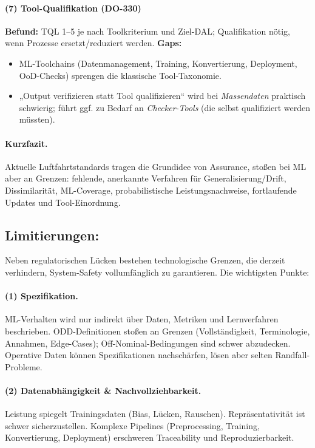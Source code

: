 \paragraph{(7) Tool-Qualifikation (DO-330)}
\textbf{Befund:} TQL 1–5 je nach Toolkriterium und Ziel-DAL; Qualifikation nötig, wenn Prozesse ersetzt/reduziert werden.  
\textbf{Gaps:}
\begin{itemize}
  \item ML-Toolchains (Datenmanagement, Training, Konvertierung, Deployment, OoD-Checks) sprengen die klassische Tool-Taxonomie.
  \item „Output verifizieren statt Tool qualifizieren“ wird bei \emph{Massendaten} praktisch schwierig; führt ggf. zu Bedarf an \emph{Checker-Tools} (die selbst qualifiziert werden müssten).
\end{itemize}

\paragraph{Kurzfazit.}
Aktuelle Luftfahrtstandards tragen die Grundidee von Assurance, stoßen bei ML aber an Grenzen: fehlende, anerkannte Verfahren für Generalisierung/Drift, Dissimilarität, ML-Coverage, probabilistische Leistungsnachweise, fortlaufende Updates und Tool-Einordnung.

\subsection{Limitierungen:}
Neben regulatorischen Lücken bestehen technologische Grenzen, die derzeit verhindern, System-Safety vollumfänglich zu garantieren. Die wichtigsten Punkte:

\paragraph{(1) Spezifikation.}
ML-Verhalten wird nur indirekt über Daten, Metriken und Lernverfahren beschrieben. ODD-Definitionen stoßen an Grenzen (Vollständigkeit, Terminologie, Annahmen, Edge-Cases); Off-Nominal-Bedingungen sind schwer abzudecken. Operative Daten können Spezifikationen nachschärfen, lösen aber selten Randfall-Probleme.

\paragraph{(2) Datenabhängigkeit \& Nachvollziehbarkeit.}
Leistung spiegelt Trainingsdaten (Bias, Lücken, Rauschen). Repräsentativität ist schwer sicherzustellen. Komplexe Pipelines (Preprocessing, Training, Konvertierung, Deployment) erschweren Traceability und Reproduzierbarkeit.

